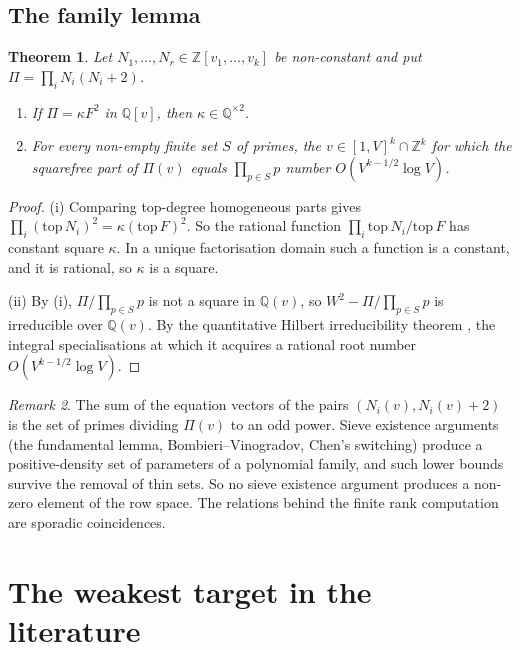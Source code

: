 \documentclass[11pt]{amsart}
\newtheorem{theorem}{Theorem}[section]
\theoremstyle{definition}
\theoremstyle{remark}
\newtheorem{remark}[theorem]{Remark}
\newcommand{\Z}{\mathbb{Z}}
\begin{document}
\subsection{The family lemma}
\begin{theorem}\label{thm:family}
Let $N_1,\dots,N_r\in\Z[v_1,\dots,v_k]$ be non-constant and put $\Pi=\prod_iN_i(N_i+2)$.
\begin{enumerate}
\item[(i)] If $\Pi=\kappa F^2$ in $\mathbb Q[v]$, then $\kappa\in\mathbb Q^{\times2}$.
\item[(ii)] For every non-empty finite set $S$ of primes, the $v\in[1,V]^k\cap\Z^k$ for which the squarefree part of $\Pi(v)$ equals $\prod_{p\in S}p$ number $O(V^{k-1/2}\log V)$.
\end{enumerate}
\end{theorem}
\begin{proof}
(i) Comparing top-degree homogeneous parts gives $\prod_i(\mathrm{top}\,N_i)^2=\kappa(\mathrm{top}\,F)^2$. So the rational function $\prod_i\mathrm{top}\,N_i/\mathrm{top}\,F$ has constant square $\kappa$. In a unique factorisation domain such a function is a constant, and it is rational, so $\kappa$ is a square.

(ii) By (i), $\Pi/\prod_{p\in S}p$ is not a square in $\mathbb Q(v)$, so $W^2-\Pi/\prod_{p\in S}p$ is irreducible over $\mathbb Q(v)$. By the quantitative Hilbert irreducibility theorem \cite{Coh81}, the integral specialisations at which it acquires a rational root number $O(V^{k-1/2}\log V)$.
\end{proof}

\begin{remark}
The sum of the equation vectors of the pairs $(N_i(v),N_i(v)+2)$ is the set of primes dividing $\Pi(v)$ to an odd power. Sieve existence arguments (the fundamental lemma, Bombieri--Vinogradov, Chen's switching) produce a positive-density set of parameters of a polynomial family, and such lower bounds survive the removal of thin sets. So no sieve existence argument produces a non-zero element of the row space. The relations behind the finite rank computation are sporadic coincidences.
\end{remark}

\section{The weakest target in the literature}\label{sec:existence}
\end{document}
